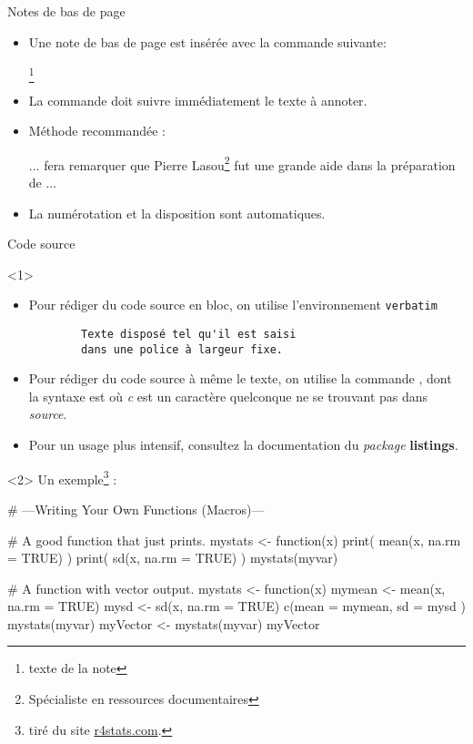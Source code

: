 \begin{frame}[fragile,c]{Notes de bas de page}
	\begin{itemize}
		\item Une note de bas de page est insérée avec la commande suivante:
\begin{codesource}
	\footnote{texte de la note}
\end{codesource}
		\item La commande doit suivre immédiatement le texte à annoter.
		\item Méthode recommandée :
\begin{codesource}
	... fera remarquer que Pierre Lasou\footnote{%
	Spécialiste en ressources documentaires} %
	fut une grande aide dans la préparation de ...
\end{codesource}
		\item La numérotation et la disposition sont automatiques.
	\end{itemize}
\end{frame}

\begin{frame}[fragile,c]{Code source}
	\begin{onlyenv}
		\begin{itemize}
			\item Pour rédiger du code source en bloc, on utilise l'environnement \texttt{verbatim}
\begin{codesource}
	\begin{verbatim}
		Texte disposé tel qu'il est saisi
		dans une police à largeur fixe.
	\end{verbatim}
\end{codesource}
			\item Pour rédiger du code source à même le texte, on utilise la commande , dont la
			syntaxe est  où \emph{c} est un caractère quelconque ne se trouvant pas dans \emph{source}.
			\item Pour un usage plus intensif, consultez la documentation du \emph{package} \textbf{listings}.
		\end{itemize}
	\end{onlyenv}

	\begin{onlyenv}
	Un exemple\footnote{tiré du site \href{http://r4stats.com/examples/programming/}{r4stats.com}.} :
\begin{codesource}
	# ---Writing Your Own Functions (Macros)---
	
	# A good function that just prints.
	mystats <- function(x) {
		print( mean(x, na.rm = TRUE) )
		print(   sd(x, na.rm = TRUE) )
	}
	mystats(myvar)
	
	# A function with vector output.
	mystats  <- function(x) {
		mymean <- mean(x, na.rm = TRUE)
		mysd   <-   sd(x, na.rm = TRUE)
		c(mean = mymean, sd = mysd )
	}
	mystats(myvar)
	myVector <- mystats(myvar)
	myVector
\end{codesource}
	\end{onlyenv}
\end{frame}